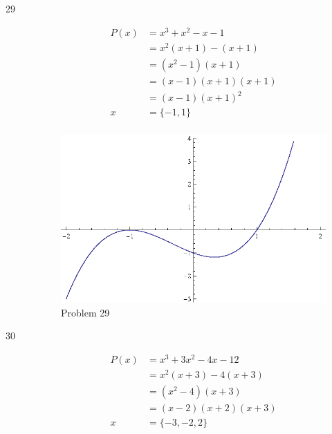 \documentclass{exam}
\begin{document}
\begin{description}
    \pagebreak

    \item[29] 
      \begin{align*}
        P(x) &= x^3 + x^2 - x - 1 \\
             &= x^2(x + 1) - (x + 1) \\
             &= (x^2 - 1)(x + 1) \\
             &= (x - 1)(x + 1)(x + 1) \\
             &= (x - 1)(x + 1)^2 \\
        x    &= \{ -1, 1 \} \\
      \end{align*}
      
      \begin{figure}[H]
        \centering
        \includegraphics[scale=0.9]{problem29.eps}
        \caption*{Problem 29}
      \end{figure}

    \pagebreak

    \item[30] 
      \begin{align*}
        P(x) &= x^3 + 3x^2 - 4x - 12 \\
             &= x^2(x + 3) - 4(x + 3) \\
             &= (x^2 - 4)(x + 3) \\
             &= (x - 2)(x + 2)(x + 3) \\
        x    &= \{ -3, -2, 2 \} \\
      \end{align*}
      

\end{description}
\end{document}
